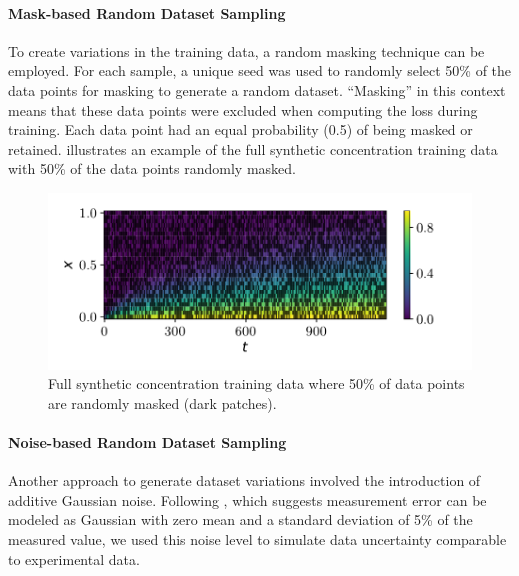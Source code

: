 \paragraph{Mask-based Random Dataset Sampling}

To create variations in the training data, a random masking technique can be employed. For each sample, a unique seed was used to randomly select 50\% of the data points for masking to generate a random dataset. ``Masking'' in this context means that these data points were excluded when computing the loss during training. Each data point had an equal probability (0.5) of being masked or retained.  illustrates an example of the full synthetic concentration training data with 50\% of the data points randomly masked.

\begin{figure}[h!]
    \centering
    \includegraphics{figs/c_diss_field_train_random_subset.pdf}
    \caption{Full synthetic concentration training data where 50\% of data points are randomly masked (dark patches).}
    \label{fig:training_data_mask}
\end{figure}


\paragraph{Noise-based Random Dataset Sampling}
\label{sec:da-nnpie_gaussian_noise}
Another approach to generate dataset variations involved the introduction of additive Gaussian noise. Following \textcite{nowak2016entropy}, which suggests measurement error can be modeled as Gaussian with zero mean and a standard deviation of 5\% of the measured value, we used this noise level to simulate data uncertainty comparable to experimental data.


